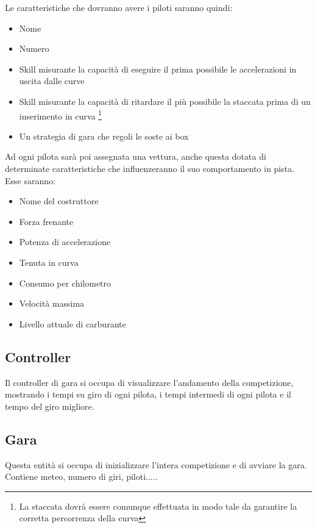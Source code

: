 \documentclass[a4paper,11pt, twoside]{book}
\begin{document}
        Le caratteristiche che dovranno avere i piloti saranno quindi:
        
        \begin{itemize}
	  \item Nome 
	  \item Numero
	  \item Skill misurante la capacità di eseguire il prima possibile le accelerazioni in uscita dalle curve
	  \item Skill misurante la capacità di ritardare il più possibile la staccata prima di un inserimento in curva 
	        \footnote{La staccata dovrà essere comunque effettuata in modo tale da garantire la 
	        corretta percorrenza della curva}
	  \item Un strategia di gara che regoli le soste ai box
	\end{itemize}
	
        
        Ad ogni pilota sarà poi assegnata una vettura, anche questa dotata di determinate caratteristiche che influenzeranno il suo
        comportamento in pista. Esse saranno:
        
        \begin{itemize}
          \item Nome del costruttore
          \item Forza frenante
          \item Potenza di accelerazione
          \item Tenuta in curva
          \item Consumo per chilometro
          \item Velocità massima
          \item Livello attuale di carburante
        \end{itemize}

      \subsection{Controller}
        Il controller di gara si occupa di visualizzare l'andamento della competizione, mostrando
        i tempi su giro di ogni pilota, i tempi intermedi di ogni pilota e il tempo del giro migliore.
        
      \subsection{Gara}
        Questa entità si occupa di inizializzare l'intera competizione e di avviare la gara.
        Contiene meteo, numero di giri, piloti.....
          
\end{document}
